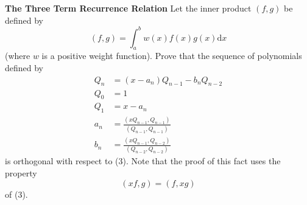 \textbf{The Three Term Recurrence Relation} Let the inner product
$(f,g)$ be defined by \[(f,g) = \int_a^b w(x) f(x) g(x) \mathrm{d}x\]
(where $w$ is a positive weight function). Prove that the sequence of
polynomials defined by
\[
\begin{aligned}
Q_n &= (x - a_n) Q_{n-1} - b_n Q_{n-2} \\
Q_0 &= 1 \\
Q_1 &= x - a_n \\
a_n &= \frac{(x Q_{n-1}, Q_{n-1})}{(Q_{n-1}, Q_{n-1})} \\
b_n &= \frac{(x Q_{n-1}, Q_{n-2})}{(Q_{n-2}, Q_{n-2})}
\end{aligned}
\]
is orthogonal with respect to (3). Note that the proof of this fact
uses the property \[(xf, g) = (f, xg)\] of (3).

{\color{blue}
}

